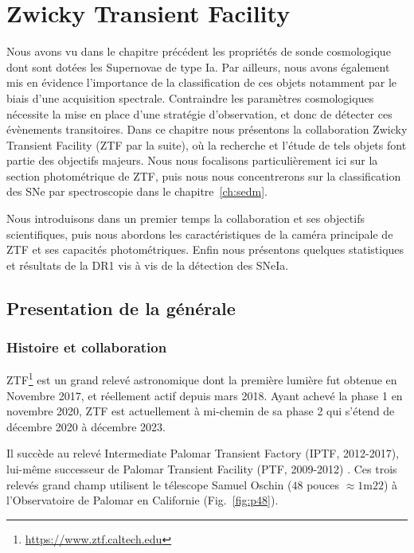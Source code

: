 \documentclass[../main/main.tex]{subfiles}
\begin{document}
\setcounter{chapter}{2}
\chapter{Zwicky Transient Facility}\label{ch:ztf}

\minitoc
\vspace{2cm}
Nous avons vu dans le chapitre précédent les propriétés
de sonde
cosmologique dont sont dotées les Supernovae de type Ia. Par
ailleurs, nous avons également mis en évidence l'importance de la
classification de ces objets notamment par le biais d'une acquisition
spectrale. Contraindre les paramètres cosmologiques nécessite la mise en
place d'une stratégie d'observation, et donc de
détecter ces évènements transitoires. Dans ce chapitre nous présentons
la collaboration Zwicky Transient Facility (ZTF par la suite), où la recherche et
l'étude de tels objets font partie des objectifs majeurs. Nous nous
focalisons particulièrement ici sur la section photométrique de
ZTF, puis nous nous concentrerons sur la classification des SNe par
spectroscopie dans le chapitre~\ref{ch:sedm}.

Nous introduisons dans un premier temps la collaboration et ses objectifs
scientifiques, puis nous abordons les caractéristiques de la caméra principale de ZTF et ses capacités
photométriques. Enfin nous présentons quelques statistiques et résultats
de la DR1 vis à vis de la détection des SNeIa.
\newpage
\section{Presentation de la générale}
\label{sec:ztfcollab}


\subsection{Histoire et collaboration}

ZTF\footnote{\url{https://www.ztf.caltech.edu}} \citep{GrahamZTF2019,BellmZTF2019}  est un grand relevé astronomique dont la première lumière fut
obtenue en Novembre 2017, et réellement actif depuis mars
2018. Ayant achevé la phase 1 en novembre 2020, ZTF est actuellement à
mi-chemin de sa phase 2 qui s'étend de décembre 2020 à décembre 2023.

Il succède au relevé Intermediate Palomar Transient Factory (IPTF, 2012-2017),
lui-même successeur de Palomar Transient Facility (PTF, 2009-2012)
\citep{RauPTF2009,LawPTF2009}. Ces trois relevés grand
champ utilisent le télescope Samuel
Oschin ($48$ pouces $\approx 1\text{m}22$) à l'Observatoire de Palomar en
Californie (Fig.~\ref{fig:p48}).
\end{document}
